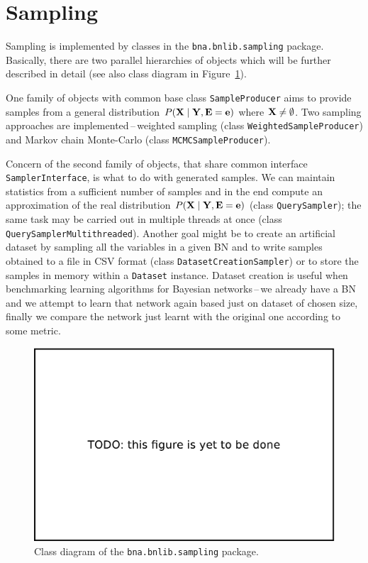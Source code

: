 \documentclass[english,cover]{fitthesis} %
\newcommand{\srccode}[1]{{\tt #1}}         %
\newcommand{\vars}[1]{{\bold{#1}}}         %
\newcommand{\todo}[1]{{\color{red}#1}}
\begin{document}
\section{Sampling}
Sampling is implemented by classes in the \srccode{bna.bnlib.sampling} package. Basically, there are two parallel hierarchies of objects which will be further described in detail \todo{(see also class diagram in Figure~\ref{fig:sapling_package_class_diagram})}.

One family of objects with common base class \srccode{SampleProducer} aims to provide samples from a general distribution $P(\vars{X} \mid \vars{Y}, \vars{E} = \vars{e})$ where $\vars{X} \neq \emptyset$. Two sampling approaches are implemented\,--\,weighted sampling (class \srccode{WeightedSampleProducer}) and Markov chain Monte-Carlo (class \srccode{MCMCSampleProducer}).

Concern of the second family of objects, that share common interface \srccode{SamplerInterface}, is what to do with generated samples. We can maintain statistics from a sufficient number of samples and in the end compute an approximation of the real distribution $P(\vars{X} \mid \vars{Y}, \vars{E} = \vars{e})$ (class \srccode{QuerySampler}); the same task may be carried out in multiple threads at once (class \srccode{QuerySamplerMultithreaded}). Another goal might be to create an artificial dataset by sampling all the variables in a given BN and to write samples obtained to a file in CSV format (class \srccode{DatasetCreationSampler}) or to store the samples in memory within a \srccode{Dataset} instance. Dataset creation is useful when benchmarking learning algorithms for Bayesian networks\,--\,we already have a BN and we attempt to learn that network again based just on dataset of chosen size, finally we compare the network just learnt with the original one according to some metric.

\begin{center}
\begin{figure}[h]
    \begin{center}
    \includegraphics[scale=0.4]{fig/todo}
    \end{center}
    \caption{Class diagram of the \srccode{bna.bnlib.sampling} package.}
    \label{fig:sapling_package_class_diagram}
\end{figure}
\end{center}
\end{document}

